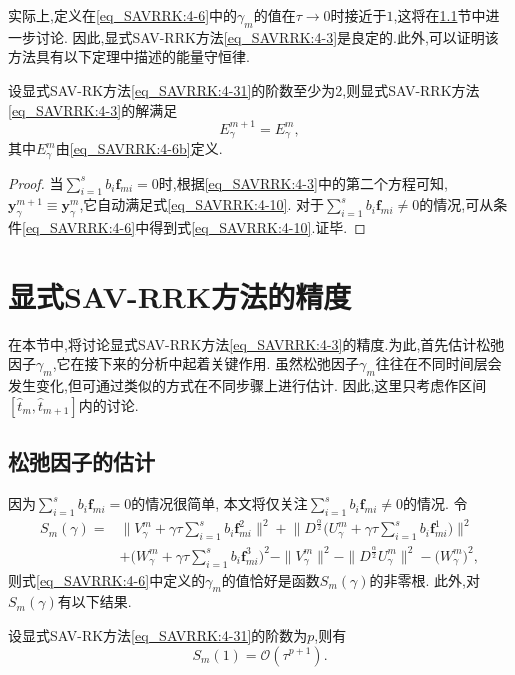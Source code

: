 实际上,定义在\eqref{eq_SAVRRK:4-6}中的$\gamma_m$的值在$\tau\rightarrow 0$时接近于$1$,这将在\ref{Section_SAVRRK: 5-1}节中进一步讨论.
因此,显式SAV-RRK方法\eqref{eq_SAVRRK:4-3}是良定的.此外,可以证明该方法具有以下定理中描述的能量守恒律.
\begin{theorem}
设显式SAV-RK方法\eqref{eq_SAVRRK:4-31}的阶数至少为2,则显式SAV-RRK方法\eqref{eq_SAVRRK:4-3}的解满足
\begin{equation}
E_{\gamma}^{m+1}=E_{\gamma}^{m}, \label{eq_SAVRRK:4-10}
\end{equation}
其中$E_{\gamma}^{m}$由\eqref{eq_SAVRRK:4-6b}定义.
\end{theorem}

\begin{proof}
当$\sum\limits_{i=1}^s b_i \bm{f}_{m i}=0$时,根据\eqref{eq_SAVRRK:4-3}中的第二个方程可知, $\bm{y}_\gamma^{m+1}\equiv\bm{y}_\gamma^m$,它自动满足式\eqref{eq_SAVRRK:4-10}.
对于$\sum\limits_{i=1}^s b_i \bm{f}_{m i}\neq 0$的情况,可从条件\eqref{eq_SAVRRK:4-6}中得到式\eqref{eq_SAVRRK:4-10}.证毕.
\end{proof}

\section{显式SAV-RRK方法的精度}\label{Section_SAVRRK: 5}
在本节中,将讨论显式SAV-RRK方法\eqref{eq_SAVRRK:4-3}的精度.为此,首先估计松弛因子$\gamma_m$,它在接下来的分析中起着关键作用.
虽然松弛因子$\gamma_m$往往在不同时间层会发生变化,但可通过类似的方式在不同步骤上进行估计.
因此,这里只考虑作区间$\left[\hat{t}_m, \hat{t}_{m+1}\right]$内的讨论.

\subsection{松弛因子的估计}\label{Section_SAVRRK: 5-1}

因为$\sum\limits_{i=1}^s b_i \bm{f}_{m i} = 0$的情况很简单, 本文将仅关注$\sum\limits_{i=1}^s b_i \bm{f}_{m i} \neq 0$的情况.
令
\begin{equation}
\begin{aligned}\label{eq_SAVRRK:sm}
S_m(\gamma)=&\big\|V_\gamma^m+\gamma \tau \sum\limits_{i=1}^s b_i \bm{f}_{m i}^2\big\|^2 + \big\|D^\frac{\alpha}{2} \big(U_\gamma^m+\gamma \tau \sum\limits_{i=1}^s b_i \bm{f}_{m i}^1\big)\big\|^2\\
&+\big(W_\gamma^m+\gamma \tau \sum\limits_{i=1}^s b_i \bm{f}_{m i}^3\big)^2-\|V_\gamma^{m}\|^2 - \|D^\frac{\alpha}{2} U_\gamma^{m}\|^2-\big(W_\gamma^{m}\big)^2,
\end{aligned}
\end{equation}
则式\eqref{eq_SAVRRK:4-6}中定义的$\gamma_m$的值恰好是函数$S_m(\gamma)$的非零根.
此外,对$S_m(\gamma)$有以下结果.
\begin{lemma}\label{lem_SAVRRK:5_1}
设显式SAV-RK方法\eqref{eq_SAVRRK:4-31}的阶数为$p$,则有
\begin{equation}
S_m(1)=\mathcal{O}(\tau^{p+1}).
\end{equation}
\end{lemma}

